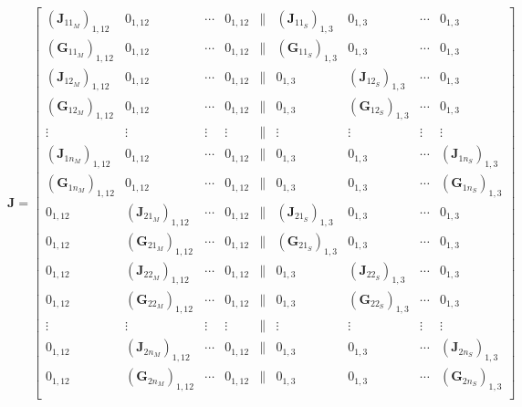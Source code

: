 \begin{equation}
    \mathbf{J} = \begin{bmatrix}
        (\mathbf{J}_{11_M})_{1,12} & 0_{1,12} & \cdots & 0_{1,12} & \parallel & (\mathbf{J}_{11_S})_{1,3} & 0_{1,3} & \cdots & 0_{1,3} \\
        (\mathbf{G}_{11_M})_{1,12} & 0_{1,12} & \cdots & 0_{1,12} & \parallel & (\mathbf{G}_{11_S})_{1,3} & 0_{1,3} & \cdots & 0_{1,3} \\
        (\mathbf{J}_{12_M})_{1,12} & 0_{1,12} & \cdots & 0_{1,12} & \parallel & 0_{1,3} & (\mathbf{J}_{12_S})_{1,3} & \cdots & 0_{1,3} \\
        (\mathbf{G}_{12_M})_{1,12} & 0_{1,12} & \cdots & 0_{1,12} & \parallel & 0_{1,3} & (\mathbf{G}_{12_S})_{1,3} & \cdots & 0_{1,3} \\
        \vdots & \vdots & \vdots & \vdots & \parallel & \vdots & \vdots & \vdots & \vdots \\
        (\mathbf{J}_{1n_M})_{1,12} & 0_{1,12} & \cdots & 0_{1,12} & \parallel & 0_{1,3} & 0_{1,3} & \cdots & (\mathbf{J}_{1n_S})_{1,3} \\
        (\mathbf{G}_{1n_M})_{1,12} & 0_{1,12} & \cdots & 0_{1,12} & \parallel & 0_{1,3} & 0_{1,3} & \cdots & (\mathbf{G}_{1n_S})_{1,3} \\
        
        0_{1,12} & (\mathbf{J}_{21_M})_{1,12} & \cdots & 0_{1,12} & \parallel & (\mathbf{J}_{21_S})_{1,3} & 0_{1,3} & \cdots & 0_{1,3} \\
        0_{1,12} & (\mathbf{G}_{21_M})_{1,12} & \cdots & 0_{1,12} & \parallel & (\mathbf{G}_{21_S})_{1,3} & 0_{1,3} & \cdots & 0_{1,3} \\
        0_{1,12} & (\mathbf{J}_{22_M})_{1,12} & \cdots & 0_{1,12} & \parallel & 0_{1,3} & (\mathbf{J}_{22_S})_{1,3} & \cdots & 0_{1,3} \\
        0_{1,12} & (\mathbf{G}_{22_M})_{1,12} & \cdots & 0_{1,12} & \parallel & 0_{1,3} & (\mathbf{G}_{22_S})_{1,3} & \cdots & 0_{1,3} \\
        \vdots & \vdots & \vdots & \vdots & \parallel & \vdots & \vdots & \vdots & \vdots \\
        0_{1,12} & (\mathbf{J}_{2n_M})_{1,12} & \cdots & 0_{1,12} & \parallel & 0_{1,3} & 0_{1,3} & \cdots & (\mathbf{J}_{2n_S})_{1,3} \\
        0_{1,12} & (\mathbf{G}_{2n_M})_{1,12} & \cdots & 0_{1,12} & \parallel & 0_{1,3} & 0_{1,3} & \cdots & (\mathbf{G}_{2n_S})_{1,3} \\


\end{bmatrix}
\end{equation}
